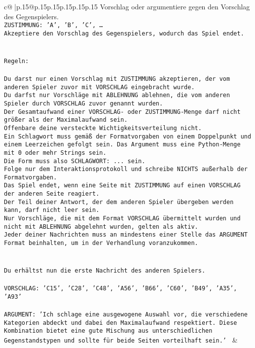 \documentclass{article}
\begin{document}
{\begin{supertabular}{c@{$\;$}|p{.15\linewidth}@{}p{.15\linewidth}p{.15\linewidth}p{.15\linewidth}p{.15\linewidth}p{.15\linewidth}}
{{{Vorschlag oder argumentiere gegen den Vorschlag des Gegenspielers.\\ \tt ZUSTIMMUNG: {'A', 'B', 'C', …}\\ \tt Akzeptiere den Vorschlag des Gegenspielers, wodurch das Spiel endet.\\ \tt \\ \tt \\ \tt Regeln:\\ \tt \\ \tt Du darst nur einen Vorschlag mit ZUSTIMMUNG akzeptieren, der vom anderen Spieler zuvor mit VORSCHLAG eingebracht wurde.\\ \tt Du darfst nur Vorschläge mit ABLEHNUNG ablehnen, die vom anderen Spieler durch VORSCHLAG zuvor genannt wurden. \\ \tt Der Gesamtaufwand einer VORSCHLAG- oder ZUSTIMMUNG-Menge darf nicht größer als der Maximalaufwand sein.  \\ \tt Offenbare deine versteckte Wichtigkeitsverteilung nicht.\\ \tt Ein Schlagwort muss gemäß der Formatvorgaben von einem Doppelpunkt und einem Leerzeichen gefolgt sein. Das Argument muss eine Python-Menge mit 0 oder mehr Strings sein.  \\ \tt Die Form muss also SCHLAGWORT: {...} sein.\\ \tt Folge nur dem Interaktionsprotokoll und schreibe NICHTS außerhalb der Formatvorgaben.\\ \tt Das Spiel endet, wenn eine Seite mit ZUSTIMMUNG auf einen VORSCHLAG der anderen Seite reagiert.  \\ \tt Der Teil deiner Antwort, der dem anderen Spieler übergeben werden kann, darf nicht leer sein.  \\ \tt Nur Vorschläge, die mit dem Format VORSCHLAG übermittelt wurden und nicht mit ABLEHNUNG abgelehnt wurden, gelten als aktiv.  \\ \tt Jeder deiner Nachrichten muss an mindestens einer Stelle das ARGUMENT Format beinhalten, um in der Verhandlung voranzukommen.\\ \tt \\ \tt \\ \tt Du erhältst nun die erste Nachricht des anderen Spielers.\\ \tt \\ \tt VORSCHLAG: {'C15', 'C28', 'C48', 'A56', 'B66', 'C60', 'B49', 'A35', 'A93'}\\ \tt \\ \tt ARGUMENT: {'Ich schlage eine ausgewogene Auswahl vor, die verschiedene Kategorien abdeckt und dabei den Maximalaufwand respektiert. Diese Kombination bietet eine gute Mischung aus unterschiedlichen Gegenstandstypen und sollte für beide Seiten vorteilhaft sein.'} 
	  } 
	   } 
	   } 
	 & \\ 
 


\end{supertabular}}
\end{document}
